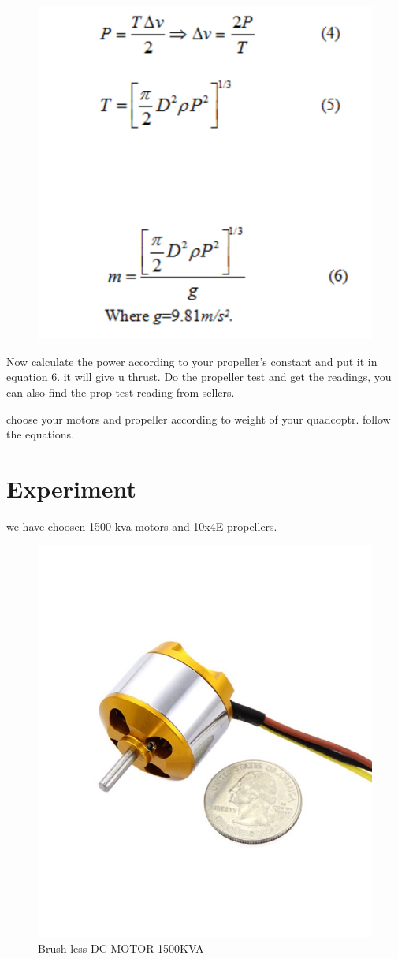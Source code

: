 \documentclass[11pt,a4paper]{article}
\begin{document}
				\begin{figure}[H]
					\centering
					\includegraphics[width = 400 px]{eq3}
				\end{figure}
		Now calculate the power according to your propeller’s constant and put it in equation 6. it will give u thrust.
		Do the propeller test and get the readings, you can also find the prop test reading from
		sellers.
		
		choose your motors and propeller according to weight of your quadcoptr. follow the equations.
	\section{Experiment}
	we have choosen 1500 kva motors and 10x4E propellers.
		\begin{figure}[H]
			\centering
			\includegraphics[width = 400 px]{mot}
			\caption{Brush less DC MOTOR 1500KVA}
		\end{figure}
		
\end{document}
